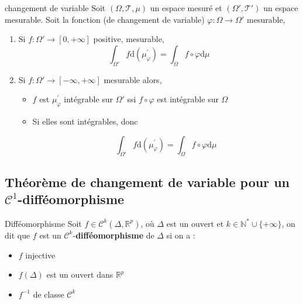 \begin{Theorem}{changement de variable}{}
Soit $(\Omega, \mathcal{T},\mu)$ un espace mesuré et $(\Omega', \mathcal{T}')$ un espace mesurable. Soit la fonction (de changement de variable) $\varphi : \Omega \to \Omega'$ mesurable, 

\begin{enumerate}

  \item Si $f : \Omega' \to [0, +\infty]$ positive, mesurable, 
    \begin{equation}
      \int_{\Omega'}^{} f \mathrm{d}(\mu ^{'}_ {\varphi}) = \int_{\Omega}^{} f \circ \varphi \mathrm{d}\mu
    \end{equation}

    \item Si $f : \Omega' \to [- \infty, +\infty]$ mesurable alors, 
      \begin{itemize}

          \item $f$ est $\mu_ \varphi ^{'}$ intégrable sur $\Omega'$ ssi $f \circ \varphi$ est intégrable sur $\Omega$

          \item {\color{red}Si elles sont intégrables}, donc 

    \begin{equation}
      \int_{\Omega'}^{} f \mathrm{d}(\mu ^{'}_ {\varphi}) = \int_{\Omega}^{} f \circ \varphi \mathrm{d}\mu
    \end{equation}

      \end{itemize}


\end{enumerate}
\end{Theorem}


\subsection{Théorème de changement de variable pour un $\mathscr{C}^{1}$-difféomorphisme} %


\begin{Definition}[colbacktitle=red!75!black]{Difféomorphisme}{}
  Soit $f \in \mathscr{C} ^{k}(\Delta, \mathbb{R} ^{p})$, où $\Delta$ est un ouvert et $k \in \mathbb{N} ^{*} \cup \{+\infty\}$, on dit que $f$ est un $\mathscr{C} ^{k}$-\textbf{difféomorphisme} de $\Delta$ si on a : 
  \begin{itemize}

      \item $f$ injective 
      \item $f(\Delta)$ est un ouvert dans $\mathbb{R} ^{p}$ 
      \item $f ^{-1}$ de classe $\mathscr{C} ^{k}$

  \end{itemize}
\end{Definition}

